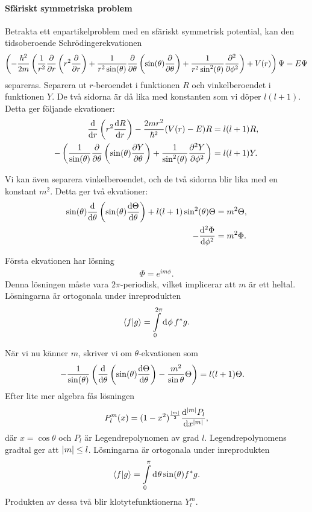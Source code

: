 \paragraph{Sfäriskt symmetriska problem}
Betrakta ett enpartikelproblem med en sfäriskt symmetrisk potential, kan den tidsoberoende Schrödingerekvationen
\begin{align*}
	\left(-\frac{\hbar^{2}}{2m}\left(\frac{1}{r^{2}}\pdv{r}\left(r^{2}\pdv{r}\right) + \frac{1}{r^{2}\sin(\theta)}\pdv{\theta}\left(\sin(\theta)\pdv{\theta}\right) + \frac{1}{r^{2}\sin^{2}(\theta)}\pdv[2]{\phi}\right) + V(r)\right)\Psi = E\Psi
\end{align*}
separeras. Separera ut $r$-beroendet i funktionen $R$ och vinkelberoendet i funktionen $Y$. De två sidorna är då lika med konstanten som vi döper $l(l + 1)$. Detta ger följande ekvationer:
\begin{align*}
	\dv{r}\left(r^{2}\dv{R}{r}\right) -\frac{2mr^{2}}{\hbar^{2}}(V(r) - E)R &= l(l + 1)R, \\
	- \left(\frac{1}{\sin(\theta)}\pdv{\theta}\left(\sin(\theta)\pdv{Y}{\theta}\right) + \frac{1}{\sin^{2}(\theta)}\pdv[2]{Y}{\phi}\right)                           &= l(l + 1)Y.
\end{align*}

Vi kan även separera vinkelberoendet, och de två sidorna blir lika med en konstant $m^{2}$. Detta ger två ekvationer:
\begin{align*}
	\sin(\theta)\dv{\theta}\left(\sin(\theta)\dv{\Theta}{\theta}\right) + l(l + 1)\sin[2](\theta)\Theta          &= m^{2}\Theta, \\
	-\dv[2]{\Phi}{\phi} &= m^{2}\Phi.
\end{align*}

Första ekvationen har lösning
\begin{align*}
	\Phi = e^{im\phi}.
\end{align*}
Denna lösningen måste vara $2\pi$-periodisk, vilket implicerar att $m$ är ett heltal. Lösningarna är ortogonala under inreprodukten
\begin{align*}
	\braket{f}{g} = \int\limits_{0}^{2\pi}\dd[]{\phi}f^{*}g.
\end{align*}

När vi nu känner $m$, skriver vi om $\theta$-ekvationen som
\begin{align*}
	-\frac{1}{\sin(\theta)}\left(\dv{\theta}\left(\sin(\theta)\dv{\Theta}{\theta}\right) - \frac{m^{2}}{\sin{\theta}}\Theta\right) &= l(l + 1)\Theta.
\end{align*}
Efter lite mer algebra fås lösningen
\begin{align*}
	P_{l}^{m}(x) = (1 - x^{2})^{\frac{\abs{m}}{2}}\dv[\abs{m}]{P_{l}}{x},
\end{align*}
där $x = \cos{\theta}$ och $P_{l}$ är Legendrepolynomen av grad $l$. Legendrepolynomens gradtal ger att $\abs{m}\leq l$. Lösningarna är ortogonala under inreprodukten
\begin{align*}
	\braket{f}{g} = \int\limits_{0}^{\pi}\dd[]{\theta}\sin(\theta)f^{*}g.
\end{align*}
Produkten av dessa två blir klotytefunktionerna $Y_{l}^{m}$.

